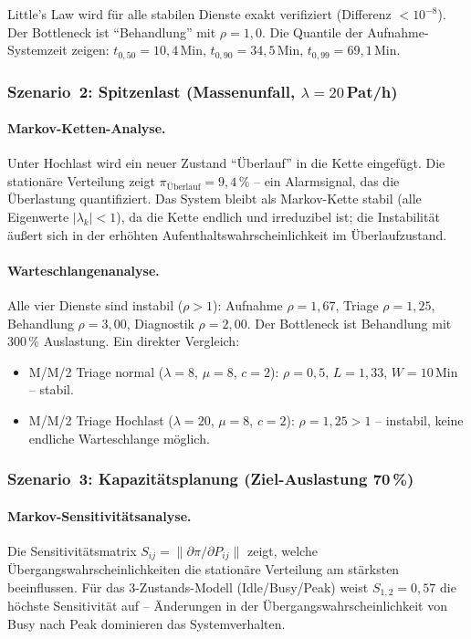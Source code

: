 ﻿\documentclass[a4paper,12pt]{scrreprt}
\theoremstyle{definition}
\begin{document}
Little's Law wird für alle stabilen Dienste exakt verifiziert
(Differenz $< 10^{-8}$). Der Bottleneck ist ``Behandlung'' mit $\rho = 1{,}0$.
Die Quantile der Aufnahme-Systemzeit zeigen:
$t_{0{,}50} = 10{,}4$\,Min, $t_{0{,}90} = 34{,}5$\,Min, $t_{0{,}99} = 69{,}1$\,Min.

\subsubsection{Szenario~2: Spitzenlast (Massenunfall, $\lambda = 20$\,Pat/h)}

\paragraph{Markov-Ketten-Analyse.}
Unter Hochlast wird ein neuer Zustand ``Überlauf'' in die Kette eingefügt.
Die stationäre Verteilung zeigt $\pi_\text{Überlauf} = 9{,}4\,\%$ --
ein Alarmsignal, das die Überlastung quantifiziert. Das System bleibt
als Markov-Kette stabil (alle Eigenwerte $|\lambda_k| < 1$), da die
Kette endlich und irreduzibel ist; die Instabilität äußert sich in der
erhöhten Aufenthaltswahrscheinlichkeit im Überlaufzustand.

\paragraph{Warteschlangenanalyse.}
Alle vier Dienste sind instabil ($\rho > 1$): Aufnahme $\rho = 1{,}67$,
Triage $\rho = 1{,}25$, Behandlung $\rho = 3{,}00$, Diagnostik $\rho = 2{,}00$.
Der Bottleneck ist Behandlung mit $300\,\%$ Auslastung. Ein direkter Vergleich:
\begin{itemize}
	\item[-] M/M/2 Triage normal ($\lambda=8$, $\mu=8$, $c=2$):
	$\rho = 0{,}5$, $L = 1{,}33$, $W = 10$\,Min -- stabil.
	\item[-] M/M/2 Triage Hochlast ($\lambda=20$, $\mu=8$, $c=2$):
	$\rho = 1{,}25 > 1$ -- instabil, keine endliche Warteschlange möglich.
\end{itemize}

\subsubsection{Szenario~3: Kapazitätsplanung (Ziel-Auslastung 70\,\%)}

\paragraph{Markov-Sensitivitätsanalyse.}
Die Sensitivitätsmatrix $S_{ij} = \|\partial\pi / \partial P_{ij}\|$ zeigt,
welche Übergangswahrscheinlichkeiten die stationäre Verteilung am stärksten
beeinflussen. Für das 3-Zustands-Modell (Idle/Busy/Peak) weist
$S_{1,2} = 0{,}57$ die höchste Sensitivität auf -- Änderungen in der
Übergangswahrscheinlichkeit von Busy nach Peak dominieren das Systemverhalten.
\end{document}
